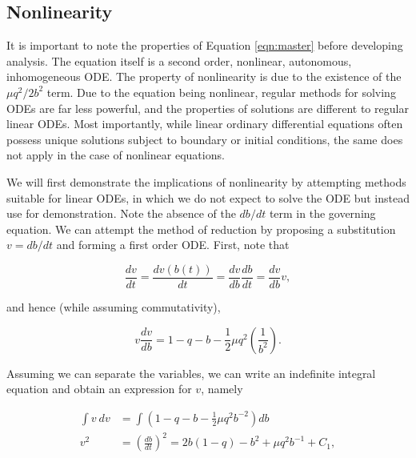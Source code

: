 \documentclass{article}
\begin{document}
\subsection{Nonlinearity}

It is important to note the properties of Equation \ref{eqn:master} before developing analysis.
The equation itself is a second order, nonlinear, autonomous, inhomogeneous ODE.
The property of nonlinearity is due to the existence of the $\mu q^2/2b^2$ term.
Due to the equation being nonlinear, regular methods for solving ODEs are far less powerful,
and the properties of solutions are different to regular linear ODEs.
Most importantly, while linear ordinary differential equations often possess unique solutions subject to boundary or initial conditions,
the same does not apply in the case of nonlinear equations.

We will first demonstrate the implications of nonlinearity by attempting methods suitable for linear ODEs,
in which we do not expect to solve the ODE but instead use for demonstration.
Note the absence of the $db/dt$ term in the governing equation.
We can attempt the method of reduction by proposing a substitution $v=db/dt$ and forming a first order ODE.
First, note that

\begin{equation}
    \frac{dv}{dt} = \frac{dv(b(t))}{dt} = \frac{dv}{db}\frac{db}{dt} = \frac{dv}{db}v,
\end{equation}

and hence (while assuming commutativity),

\begin{equation}
    v \frac{dv}{db} = 1 - q - b - \frac{1}{2}\mu q^2\left( \frac{1}{b^2} \right).
\end{equation}

Assuming we can separate the variables, we can write an indefinite integral equation and obtain an expression for $v$, namely

\begin{equation}
    \begin{aligned}
        \int v~dv &= \int \left(1 - q - b - \frac{1}{2}\mu q^2 b^{-2} \right) db \\  %
        v^2 &= \left(\frac{db}{dt}\right)^2 = 2b(1-q) - {b^2} + \mu q^2 b^{-1} + C_1, %
    \end{aligned}
    \label{eqn:first_order_reduction}
\end{equation}
\end{document}

